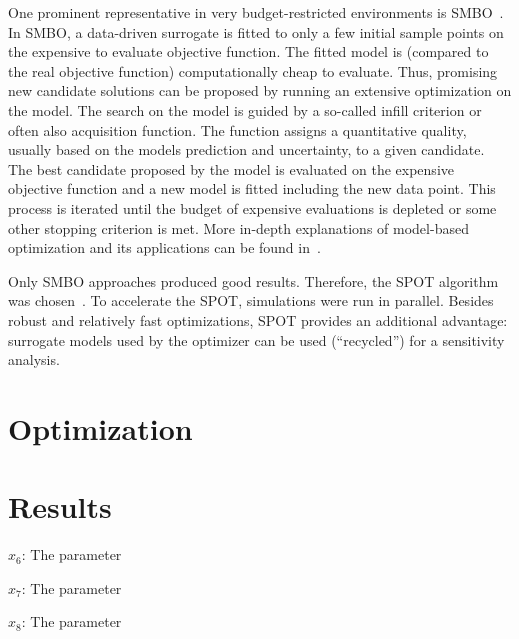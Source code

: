 \documentclass[conference]{IEEEtran}
\begin{document}
 One prominent representative in very budget-restricted environments is \gls{SMBO}~\citep{Jin11a}.
In \gls{SMBO}, a data-driven surrogate is fitted to only a few initial sample points on the expensive to evaluate objective function. 
The fitted model is (compared to the real objective function) computationally cheap to evaluate.
Thus, promising new candidate solutions can be proposed by running an extensive optimization on the model.
The search on the model is guided by a so-called infill criterion or often also acquisition function.
The function assigns a quantitative quality, usually based on the models prediction and uncertainty, to a given candidate.
The best candidate proposed by the model is evaluated on the expensive objective function and a new model is fitted including the new data point.
This process is iterated until the budget of expensive evaluations is depleted or some other stopping criterion is met. More in-depth explanations of model-based optimization and its applications can be found in~\citet{Quei05a, EGOB02, Jin19a}.

Only \gls{SMBO} approaches produced good results. 
Therefore, the \gls{SPOT} algorithm was chosen~\citep{Bart17parxiv}.
To accelerate the \gls{SPOT}, simulations were run in parallel.
Besides robust and relatively fast optimizations, \gls{SPOT} provides an additional advantage: surrogate models used by the optimizer can be used (``recycled'') for a sensitivity analysis. 

\section{Optimization}\label{sec:sa}

\section{Results}\label{sec:results}


\begin{compactitem} 
\item[$x_{6}$:] The parameter 
\item[$x_{7}$:] The parameter
\item[$x_{8}$:] The parameter \
\end{compactitem}
\end{document}
